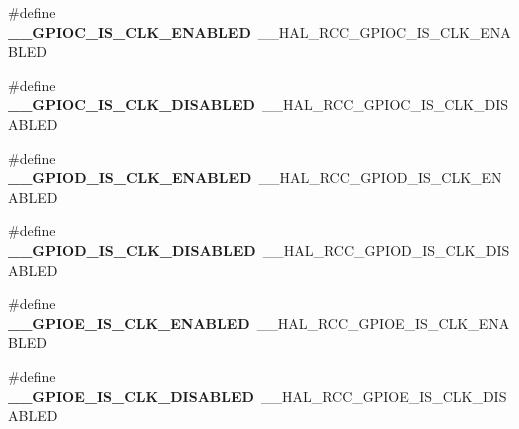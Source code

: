 \begin{DoxyCompactItemize}
\item 
\#define {\bfseries \+\_\+\+\_\+\+G\+P\+I\+O\+C\+\_\+\+I\+S\+\_\+\+C\+L\+K\+\_\+\+E\+N\+A\+B\+L\+ED}~\+\_\+\+\_\+\+H\+A\+L\+\_\+\+R\+C\+C\+\_\+\+G\+P\+I\+O\+C\+\_\+\+I\+S\+\_\+\+C\+L\+K\+\_\+\+E\+N\+A\+B\+L\+ED\hypertarget{group___h_a_l___r_c_c___aliased_ga64b0e54296b3947741c70bdce2a3ba57}{}\label{group___h_a_l___r_c_c___aliased_ga64b0e54296b3947741c70bdce2a3ba57}

\item 
\#define {\bfseries \+\_\+\+\_\+\+G\+P\+I\+O\+C\+\_\+\+I\+S\+\_\+\+C\+L\+K\+\_\+\+D\+I\+S\+A\+B\+L\+ED}~\+\_\+\+\_\+\+H\+A\+L\+\_\+\+R\+C\+C\+\_\+\+G\+P\+I\+O\+C\+\_\+\+I\+S\+\_\+\+C\+L\+K\+\_\+\+D\+I\+S\+A\+B\+L\+ED\hypertarget{group___h_a_l___r_c_c___aliased_ga739b2c7a7364dc5d14f36cac8ebe1412}{}\label{group___h_a_l___r_c_c___aliased_ga739b2c7a7364dc5d14f36cac8ebe1412}

\item 
\#define {\bfseries \+\_\+\+\_\+\+G\+P\+I\+O\+D\+\_\+\+I\+S\+\_\+\+C\+L\+K\+\_\+\+E\+N\+A\+B\+L\+ED}~\+\_\+\+\_\+\+H\+A\+L\+\_\+\+R\+C\+C\+\_\+\+G\+P\+I\+O\+D\+\_\+\+I\+S\+\_\+\+C\+L\+K\+\_\+\+E\+N\+A\+B\+L\+ED\hypertarget{group___h_a_l___r_c_c___aliased_gad7fd9332663f795ab809dd14655259bc}{}\label{group___h_a_l___r_c_c___aliased_gad7fd9332663f795ab809dd14655259bc}

\item 
\#define {\bfseries \+\_\+\+\_\+\+G\+P\+I\+O\+D\+\_\+\+I\+S\+\_\+\+C\+L\+K\+\_\+\+D\+I\+S\+A\+B\+L\+ED}~\+\_\+\+\_\+\+H\+A\+L\+\_\+\+R\+C\+C\+\_\+\+G\+P\+I\+O\+D\+\_\+\+I\+S\+\_\+\+C\+L\+K\+\_\+\+D\+I\+S\+A\+B\+L\+ED\hypertarget{group___h_a_l___r_c_c___aliased_gaf263202e283c076a7ec5befba3668bc1}{}\label{group___h_a_l___r_c_c___aliased_gaf263202e283c076a7ec5befba3668bc1}

\item 
\#define {\bfseries \+\_\+\+\_\+\+G\+P\+I\+O\+E\+\_\+\+I\+S\+\_\+\+C\+L\+K\+\_\+\+E\+N\+A\+B\+L\+ED}~\+\_\+\+\_\+\+H\+A\+L\+\_\+\+R\+C\+C\+\_\+\+G\+P\+I\+O\+E\+\_\+\+I\+S\+\_\+\+C\+L\+K\+\_\+\+E\+N\+A\+B\+L\+ED\hypertarget{group___h_a_l___r_c_c___aliased_ga93b12611227bb65b0cf39d2f8e4bfee8}{}\label{group___h_a_l___r_c_c___aliased_ga93b12611227bb65b0cf39d2f8e4bfee8}

\item 
\#define {\bfseries \+\_\+\+\_\+\+G\+P\+I\+O\+E\+\_\+\+I\+S\+\_\+\+C\+L\+K\+\_\+\+D\+I\+S\+A\+B\+L\+ED}~\+\_\+\+\_\+\+H\+A\+L\+\_\+\+R\+C\+C\+\_\+\+G\+P\+I\+O\+E\+\_\+\+I\+S\+\_\+\+C\+L\+K\+\_\+\+D\+I\+S\+A\+B\+L\+ED\hypertarget{group___h_a_l___r_c_c___aliased_gac941a0daf1c5b83cca995df7099c19a2}{}\label{group___h_a_l___r_c_c___aliased_gac941a0daf1c5b83cca995df7099c19a2}


\end{DoxyCompactItemize}
